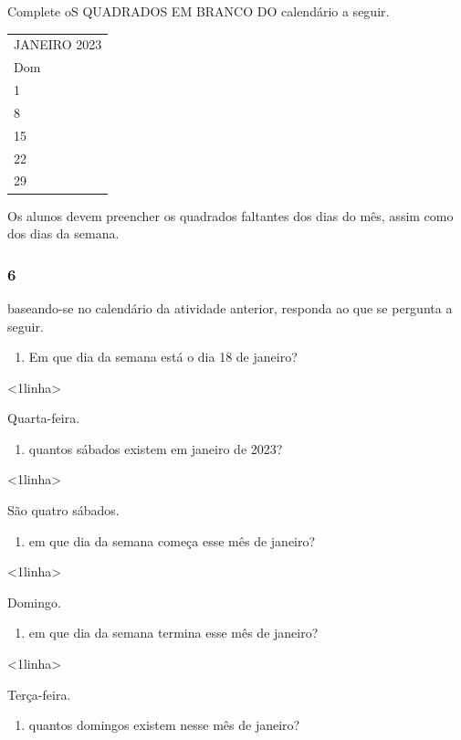 Complete oS QUADRADOS EM BRANCO DO calendário a seguir.

\begin{longtable}[]{@{}l@{}}
\toprule
JANEIRO 2023\tabularnewline
Dom\tabularnewline
1\tabularnewline
8\tabularnewline
15\tabularnewline
22\tabularnewline
29\tabularnewline
\bottomrule
\end{longtable}

Os alunos devem preencher os quadrados faltantes dos
dias do mês, assim como dos dias da semana.

\subsubsection{6}\label{section-44}

baseando-se no calendário da atividade anterior, responda ao que se pergunta a seguir.

\begin{enumerate}
\def\labelenumi{\Alph{enumi})}
\item
  Em que dia da semana está o dia 18 de janeiro?
\end{enumerate}

\textless{}1linha\textgreater{}

Quarta-feira.

\begin{enumerate}
\def\labelenumi{\Alph{enumi})}
\item
  quantos sábados existem em janeiro de 2023?
\end{enumerate}

\textless{}1linha\textgreater{}

São quatro sábados.

\begin{enumerate}
\def\labelenumi{\Alph{enumi})}
\item
  em que dia da semana começa esse mês de janeiro?
\end{enumerate}

\textless{}1linha\textgreater{}

Domingo.

\begin{enumerate}
\def\labelenumi{\Alph{enumi})}
\item
  em que dia da semana termina esse mês de janeiro?
\end{enumerate}

\textless{}1linha\textgreater{}

Terça-feira.

\begin{enumerate}
\def\labelenumi{\Alph{enumi})}
\item
  quantos domingos existem nesse mês de janeiro?
\end{enumerate}

